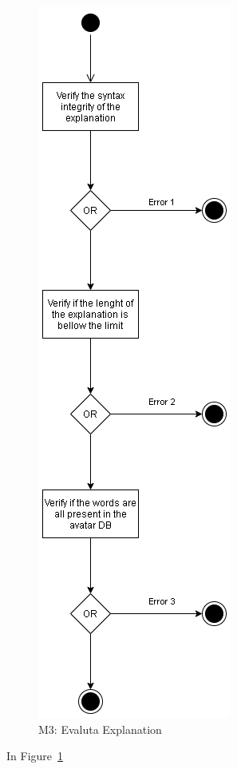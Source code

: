 \begin{figure}[H]
\centering
\includegraphics[scale=0.5]{ch4/assets/M3.png}
\caption[Evaluate Explanation Module]{M3: Evaluta Explanation}
\label{fig:M3}
\end{figure}

In Figure~\ref{fig:M3}

